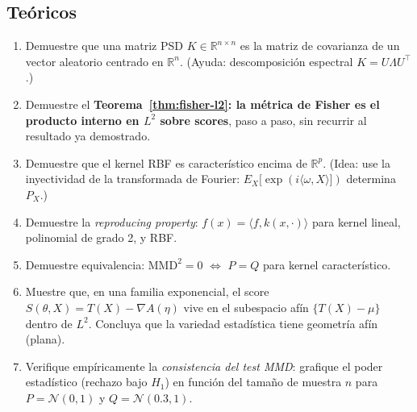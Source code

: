 \subsection*{Teóricos}
\begin{enumerate}[resume]
	\item[$\star\star\star$] Demuestre que una matriz PSD $K \in \mathbb{R}^{n\times n}$ es la matriz de covarianza de un vector aleatorio centrado en $\mathbb{R}^n$. (Ayuda: descomposición espectral $K = U\Lambda U^\top$.)
	\item[$\star\star\star$] Demuestre el \textbf{Teorema~\ref{thm:fisher-l2}: la métrica de Fisher es el producto interno en $L^2$ sobre scores}, paso a paso, sin recurrir al resultado ya demostrado.
	\item[$\star\star\star$] Demuestre que el kernel RBF es característico encima de $\mathbb{R}^p$. (Idea: use la inyectividad de la transformada de Fourier: $E_X[\exp(i\langle\omega,X\rangle])$ determina $P_X$.)
	\item[$\star\star\star$] Demuestre la \emph{reproducing property}: $f(x) = \langle f, k(x, \cdot)\rangle$ para kernel lineal, polinomial de grado 2, y RBF.
	\item[$\star\star\star$] Demuestre equivalencia: $\mathrm{MMD}^2 = 0$ $\Leftrightarrow$ $P = Q$ para kernel característico.
	\item[$\star\star\star$] Muestre que, en una familia exponencial, el score $S(\theta, X) = T(X) - \nabla A(\eta)$ vive en el subespacio afín $\{T(X) - \mu\}$ dentro de $L^2$. Concluya que la variedad estadística tiene geometría afín (plana).
	\item[$\star\star\star$] Verifique empíricamente la \emph{consistencia del test MMD}: grafique el poder estadístico (rechazo bajo $H_1$) en función del tamaño de muestra $n$ para $P=\mathcal{N}(0,1)$ y $Q=\mathcal{N}(0.3,1)$.
\end{enumerate}

